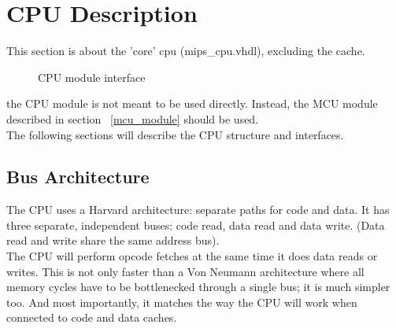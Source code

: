 
\chapter{CPU Description}
\label{cpu_description}

    This section is about the 'core' cpu (mips\_cpu.vhdl), excluding the cache.

    \begin{figure}[h]
    \caption{CPU module interface\label{cpu_symbol}}
    \end{figure}
    
    the CPU module is not meant to be used directly. Instead, the MCU module
    described in section ~\ref{mcu_module} should be used.\\
    
    The following sections will describe the CPU structure and interfaces.\\
    
\section{Bus Architecture}
\label{bus_architecture}
    The CPU uses a Harvard architecture: separate paths for code and data. It
    has three separate, independent buses: code read, data read and data write.
    (Data read and write share the same address bus).\\

    The CPU will perform opcode fetches at the same time it does data reads
    or writes. This is not only faster than a Von Neumann architecture where
    all memory cycles have to be bottlenecked through a single bus; it is much
    simpler too. And most importantly, it matches the way the CPU will work
    when connected to code and data caches.\\

